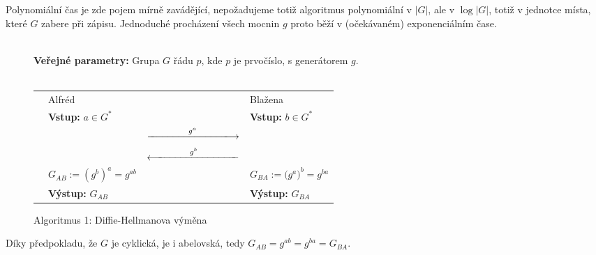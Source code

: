 \documentclass[12pt]{report}
\begin{document}
\begin{poznamka}
Polynomiální čas je zde pojem mírně zavádějící, nepožadujeme totiž algoritmus polynomiální v $\vert G \vert$, ale v $\log \vert G \vert$, totiž v jednotce místa, které $G$ zabere při zápisu. Jednoduché procházení všech mocnin $g$ proto běží v (očekávaném) exponenciálním čase. 
\end{poznamka}

\begin{figure}[h]
\begin{center} 
\makebox[1cm]{\rule{15cm}{0.4pt}}\\
\hspace{-1.35cm} \textbf{Veřejné parametry:} Grupa $G$ řádu $p$, kde $p$ je prvočíslo, s generátorem $g$.\\

\vspace{-0.25cm}
\makebox[\linewidth]{\rule{15cm}{0.4pt}}\\
\vspace{0.2cm}
\begin{tabular}{l l c l}
\cline{2-2} \cline{4-4} 
& Alfréd & & Blažena \\ 
\cline{2-2} \cline{4-4} 
& \textbf{Vstup:} $a \in G^{*}$ & & \textbf{Vstup:} $b \in G^{*}$ \\
 & & $ \xlongrightarrow{\qquad \qquad  g^a \qquad \qquad}$ &  \\
&  & $\xlongleftarrow{\qquad \qquad  g^b \qquad \qquad} $ &  \\
& $G_{AB} := \left(g^b\right)^{a} = g^{ab}$ &  & $ G_{BA} := \big(g^a\big)^{b} = g^{ba}$ \\
& \textbf{Výstup:} $G_{AB}$ & & \textbf{Výstup:} $G_{BA}$
\end{tabular}
\caption*{Algoritmus 1: Diffie-Hellmanova výměna}
\vspace{-0.3cm}
\end{center}
\end{figure}

Díky předpokladu, že $G$ je cyklická, je i abelovská, tedy $G_{AB} = g^{ab} = g^{ba} = G_{BA}$.
\begin{figure}[h]
\begin{center} 
\end{center}
\end{figure}
\end{document}
